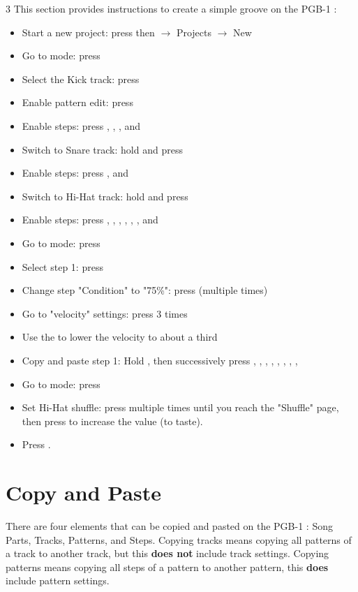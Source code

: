 \documentclass[8pt]{extarticle}
\def\device{PGB-1 }
\begin{document}
\begin{multicols*}{3}
This section provides instructions to create a simple groove on the \device:
\begin{itemize}
   \item Start a new project: press  then $\rightarrow$ Projects $\rightarrow$ New
   \item Go to  mode: press 
   \item Select the Kick track: press 
   \item Enable pattern edit: press 
   \item Enable steps: press , , , and 
   \item Switch to Snare track: hold  and press 
   \item Enable steps: press , and 
   \item Switch to Hi-Hat track: hold  and press 
   \item Enable steps: press , , , , , , and 
   \item Go to  mode: press 
   \item Select step 1: press 
   \item Change step "Condition" to "75\%": press  (multiple times)
   \item Go to "velocity" settings: press  3 times
   \item Use the  to lower the velocity to about a third
   \item Copy and paste step 1: Hold , then successively press , , , , , , , , 
   \item Go to  mode: press 
   \item Set Hi-Hat shuffle: press  multiple times until you reach the "Shuffle" page, then press  to increase the value (to taste).
   \item Press .
\end{itemize}

\section{Copy and Paste}

There are four elements that can be copied and pasted on the \device: Song Parts, Tracks, Patterns, and Steps.
Copying tracks means copying all patterns of a track to another track, but this \textbf{does not} include track settings.
Copying patterns means copying all steps of a pattern to another pattern, this \textbf{does} include pattern settings.


\end{multicols*}
\end{document}
